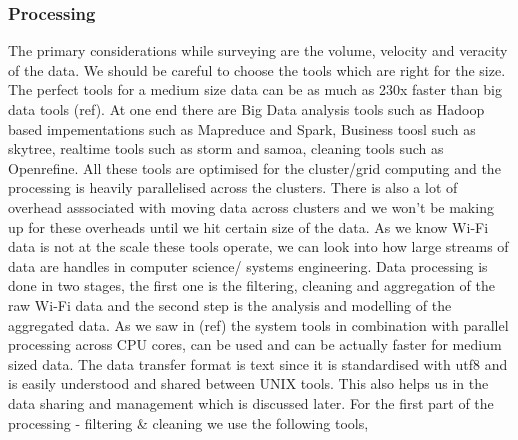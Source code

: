 \subsubsection{Processing}

The primary considerations while surveying are the volume, velocity and veracity
of the data.
We should be careful to choose the tools which are right for the size.
The perfect tools for a medium size data can be as much as 230x faster than big data tools (ref).
At one end there are Big Data analysis tools such as Hadoop based impementations such as Mapreduce and Spark, Business toosl such as skytree, realtime tools such as storm and samoa, cleaning tools such as Openrefine.
All these tools are optimised for the cluster/grid computing and the processing is heavily parallelised across the clusters.
There is also a lot of overhead asssociated with moving data across clusters and we won't be making up for these overheads until we hit certain size of the data.
As we know Wi-Fi data is not at the scale these tools operate, we can look into how large streams of data are handles in computer science/ systems engineering.
Data processing is done in two stages, the first one is the filtering, cleaning and aggregation of the raw Wi-Fi data and the second step is the analysis and modelling of the aggregated data.
As we saw in (ref) the system tools in combination with parallel processing across CPU cores, can be used and can be actually faster for medium sized data.
The data transfer format is text since it is standardised with utf8 and is easily understood and shared between UNIX tools.
This also helps us in the data sharing and management which is discussed later.
For the first part of the processing - filtering \& cleaning we use the following tools,

